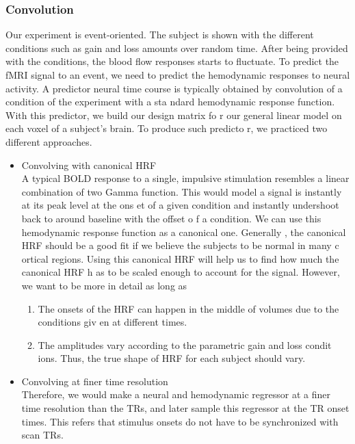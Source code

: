 \subsubsection {Convolution}
Our experiment is event-oriented. The subject is shown with the different conditions 
such as gain and loss amounts over random time. After being provided with the conditions,
 the blood flow responses starts to fluctuate. To predict the fMRI signal to an event, we
  need to predict the hemodynamic responses to neural activity. A predictor neural time 
  course is typically obtained by convolution of a condition of the experiment with a sta
  ndard hemodynamic response function. With this predictor, we build our design matrix fo
  r our general linear model on each voxel of a subject's brain. To produce such predicto
  r, we practiced two different approaches.
\begin{itemize}
\item  Convolving with canonical HRF \\
A typical BOLD response to a single, impulsive stimulation resembles a linear combination 
of two Gamma function. This would model a signal is instantly at its peak level at the ons
et of a given condition and instantly undershoot back to around baseline with the offset o
f a condition. We can use this hemodynamic response function as a canonical one. Generally
, the canonical HRF should be a good fit if we believe the subjects to be normal in many c
ortical regions. Using this canonical HRF will help us to find how much the canonical HRF h
as to be scaled enough to account for the signal. However, we want to be more in detail as 
long as 
\begin{enumerate}
  \item The onsets of the HRF can happen in the middle of volumes due to the conditions giv
en at different times. 
  \item The amplitudes vary according to the parametric gain and loss condit
ions. Thus, the true shape of HRF for each subject should vary.
\end{enumerate}

\item  Convolving at finer time resolution \\
Therefore, we would make a neural and hemodynamic regressor at a finer time resolution than
 the TRs, and later sample this regressor at the TR onset times. This refers that stimulus
  onsets do not have to be synchronized with scan TRs.


\end{itemize}
